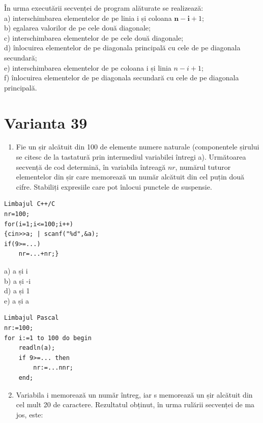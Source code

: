\documentclass[10pt]{article}
\begin{document}
În urma executării secvenței de program alăturate se realizează:\\
a) interschimbarea elementelor de pe linia i și coloana $\mathbf{n - i}+1$;\\
b) egalarea valorilor de pe cele două diagonale;\\
c) interschimbarea elementelor de pe cele două diagonale;\\
d) înlocuirea elementelor de pe diagonala principală cu cele de pe diagonala secundară;\\
e) interschimbarea elementelor de pe coloana i și linia $n-i+1$;\\
f) înlocuirea elementelor de pe diagonala secundară cu cele de pe diagonala principală.

\section*{Varianta 39}
\begin{enumerate}
  \item Fie un șir alcătuit din 100 de elemente numere naturale (componentele șirului se citesc de la tastatură prin intermediul variabilei întregi a). Următoarea secvență de cod determină, în variabila întreagă $n r$, numărul tuturor elementelor din șir care memorează un număr alcătuit din cel puțin două cifre. Stabiliți expresiile care pot înlocui punctele de suspensie.
\end{enumerate}

\begin{verbatim}
Limbajul C++/C
nr=100;
for(i=1;i<=100;i++)
{cin>>a; | scanf("%d",&a);
if(9>=...)
    nr=...+nr;}
\end{verbatim}

a) a și i\\
b) a și -i\\
d) a și 1\\
e) a și a

\begin{verbatim}
Limbajul Pascal
nr:=100;
for i:=1 to 100 do begin
    readln(a);
    if 9>=... then
        nr:=...nnr;
    end;
\end{verbatim}

\begin{enumerate}
  \setcounter{enumi}{1}
  \item Variabila i memorează un număr întreg, iar s memorează un șir alcătuit din cel mult 20 de caractere. Rezultatul obținut, în urma rulării secvenței de ma jos, este:
\end{enumerate}
\end{document}
